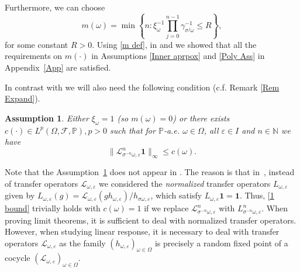 \documentclass[11pt,reqno,a4paper]{article}
\newtheorem{assumption}{Assumption}
\theoremstyle{special}
\renewcommand{\epsilon}{\varepsilon}
\renewcommand{\L}{\mathcal{L}}
\def\N{\mathbb{N}}
\def\om{\omega}
\begin{document}
Furthermore, we can choose
\begin{equation}\label{m def}
m(\omega)=\min\left\{n: \xi_\omega^{-1}\prod_{j=0}^{n-1}\gamma_{\sigma^j\omega}^{-1}\leq R\right\}, 
\end{equation}
for some constant $R>0$. Using \eqref{m def}, in \cite[Lemma 3.10]{YH 23} and  \cite[Lemma 3.11]{YH 23} we showed that all the requirements on $m(\cdot)$ in Assumptions \ref{Inner aprpox} and \ref{Poly Ass} in Appendix~\ref{App} are satisfied.


In contrast with \cite{YH 23} we will also need the following condition (c.f. Remark \ref{Rem Expand}).
\begin{assumption}\label{Add Ass}
Either $\xi_\om=1$ (so $m(\omega)=0$) or
there exists 
$c(\cdot)\in L^p(\Omega,\mathcal F,\mathbb P), p>0$ such  that
for $\mathbb P$-a.e. $\om \in \Omega$, all $\varepsilon \in I$ and $n \in \N$ we have
\begin{equation}\label{1 bound}
\|\mathcal L_{\sigma^{-n}\omega, \varepsilon}^n\mathbf {1}\|_{\infty}\leq c(\omega).   
\end{equation}

\end{assumption}
Note that the  Assumption~\ref{Add Ass} does not appear in \cite{YH 23}. The reason is  that in~\cite{YH 23},  instead of transfer operators $\mathcal L_{\om, \varepsilon}$  we considered the \emph{normalized} transfer operators $L_{\om, \varepsilon}$ given by $L_{\om, \varepsilon}(g)=\L_{\om, \varepsilon}(gh_{\om, \varepsilon})/h_{\sigma \om, \varepsilon}$, which satisfy $L_{\om, \varepsilon}\textbf{1}=\textbf{1}$. Thus, \eqref{1 bound} trivially holds with $c(\om)=1$ if we replace $\mathcal L_{\sigma^{-n}\omega, \varepsilon}^n$ with $L_{\sigma^{-n}\om, \epsilon}^n$. When proving  limit theorems, it is sufficient to deal with normalized transfer operators. However, when studying linear response, it is necessary to deal with transfer operators $\L_{\omega, \epsilon}$ as the family $(h_{\omega, \epsilon})_{\omega \in \Omega}$ is precisely a random fixed point of a cocycle $(\L_{\omega, \epsilon})_{\omega \in \Omega}$.
\end{document}
